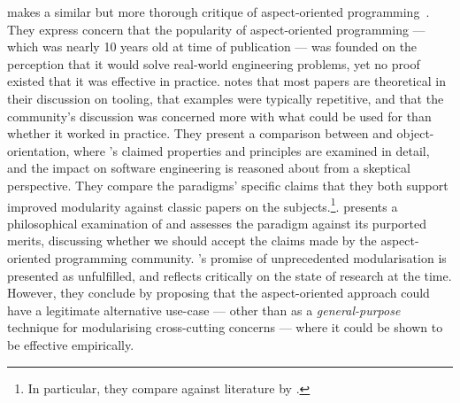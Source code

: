 \citeauthor{steimann06paradoxical} makes a similar but more thorough critique of
aspect-oriented programming~\cite{steimann06paradoxical}. They express concern
that the popularity of aspect-oriented programming --- which was nearly 10 years
old at time of publication --- was founded on the perception that it would solve
real-world engineering problems, yet no proof existed that it was effective in
practice. \citeauthor{steimann06paradoxical} notes that most papers are
theoretical in their discussion on tooling, that examples were typically
repetitive, and that the community's discussion was concerned more with what
\aspectorientation{} could be used for than whether it worked in practice. They
present a comparison between \aspectorientation{} and object-orientation, where
\aspectorientation{}'s claimed properties and principles are examined in detail,
and the impact on software engineering is reasoned about from a skeptical
perspective. They compare the paradigms' specific claims that they both support
improved modularity against classic papers on the subjects.\footnote{In
  particular, they compare against literature by \citet{Parnas_1972}.}.
\citeauthor{steimann06paradoxical} presents a philosophical examination of
\aspectorientation{} and assesses the paradigm against its purported merits,
discussing whether we should accept the claims made by the aspect-oriented
programming community. \Aspectorientation{}'s promise of unprecedented
modularisation is presented as unfulfilled, and
\citeauthor{steimann06paradoxical} reflects critically on the state of
\aspectorientation{} research at the time. However, they conclude by proposing
that the aspect-oriented approach could have a legitimate alternative use-case
--- other than as a \emph{general-purpose} technique for modularising
cross-cutting concerns --- where it could be shown to be effective empirically.


